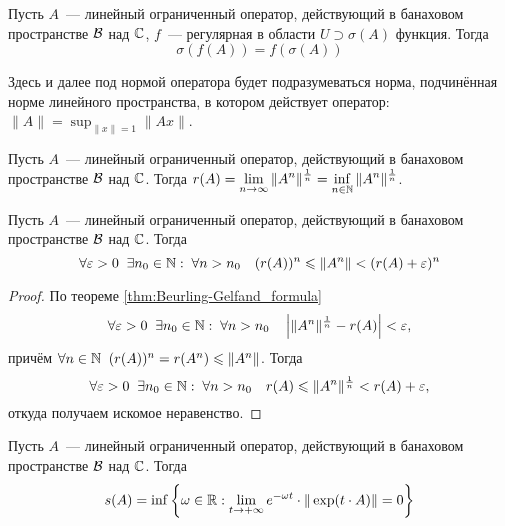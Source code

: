 \begin{theorem}
    \label{thm:spectral_mapping_theorem}
    Пусть $ A $~--- линейный ограниченный оператор, действующий в банаховом пространстве $ \mathcal{B} $ над $ \mathbb{C} $,
    $ f $~--- регулярная в области $ U \supset \sigma(A) $ функция.
    Тогда
    \begin{equation}
        \label{eq:spectral_mapping_theorem}
        \sigma(f(A)) = f(\sigma(A))
    \end{equation}
\end{theorem}

Здесь и далее под нормой оператора будет подразумеваться норма,
подчинённая норме линейного пространства,
в котором действует оператор: $\displaystyle \| A \| = \sup_{\| x \| = 1} \| A x \| $.

\begin{theorem}
    \label{thm:Beurling-Gelfand_formula}
    Пусть $ A $~--- линейный ограниченный оператор, действующий в банаховом пространстве $ \mathcal{B} $ над $ \mathbb{C} $.
    Тогда $ \displaystyle r(A) = \lim_{n \to \infty} \| A^n \|^{\frac{1}{n}} = \inf_{n \in \mathbb{N}} \| A^n \|^{\frac{1}{n}} $.
\end{theorem}

\begin{corollary}
    \label{cor:spectral_radius_norm_bounds}
    Пусть $ A $~--- линейный ограниченный оператор, действующий в банаховом пространстве $ \mathcal{B} $ над $ \mathbb{C} $.
    Тогда
    \[
        \forall \varepsilon > 0 \;\; \exists n_0 \in \mathbb{N}: \; \forall n > n_0 \quad (r(A))^n \leqslant \| A^n \| < (r(A) + \varepsilon)^n
    \]
\end{corollary}

\begin{proof}
    По теореме \ref{thm:Beurling-Gelfand_formula}
    \[
        \forall \varepsilon > 0 \;\; \exists n_0 \in \mathbb{N}: \; \forall n > n_0 \quad \left| \| A^n \|^{\frac{1}{n}} - r(A) \right| < \varepsilon,
    \]
    причём $ \forall n \in \mathbb{N} \;\; (r(A))^n = r(A^n) \leqslant \| A^n \| $.
    Тогда
    \[
        \forall \varepsilon > 0 \;\; \exists n_0 \in \mathbb{N}: \; \forall n > n_0 \quad r(A) \leqslant \| A^n \|^{\frac{1}{n}} < r(A) + \varepsilon,
    \]
    откуда получаем искомое неравенство.
\end{proof}

\begin{lemma}
    \label{lem:operator_exponential_norm_convergence}
    Пусть $ A $~--- линейный ограниченный оператор, действующий в банаховом пространстве $ \mathcal{B} $ над $ \mathbb{C} $.
    Тогда
    \[
        s(A) = \inf \left \{ \omega \in \mathbb{R}: \lim_{t \to +\infty} e^{-\omega t} \cdot \| \exp(t \cdot A) \| = 0 \right \}
    \]
\end{lemma}

